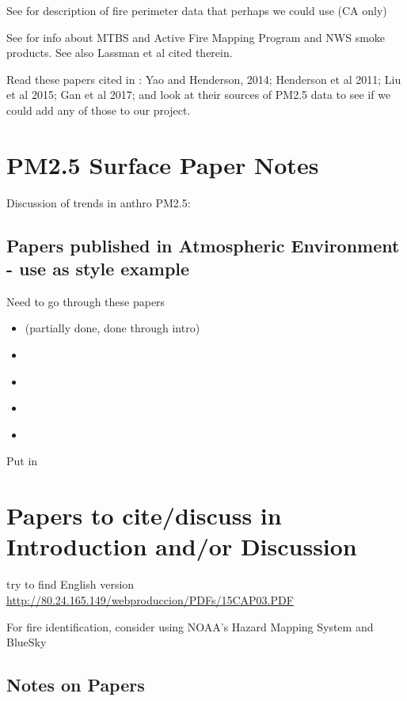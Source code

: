 See \cite{adelaine_assessment_2017} for description of fire perimeter data that perhaps we could use (CA only)

See \cite{vaidyanathan_developing_2018} for info about MTBS and Active Fire Mapping Program and NWS smoke products. See also Lassman et al \cite{lassman_spatial_2017} cited therein.

Read these papers cited in \cite{lassman_spatial_2017}: Yao and Henderson, 2014; Henderson et al 2011; Liu et al 2015; Gan et al 2017; and look at their sources of PM2.5 data to see if we could add any of those to our project.

\section{PM2.5 Surface Paper Notes}

Discussion of trends in anthro PM2.5: \cite{ridley_causes_2018}

\subsection{Papers published in Atmospheric Environment - use as style example}

Need to go through these papers
\begin{itemize}
\item \cite{BrokampExposure2017} (partially done, done through intro)
\item \cite{Sampson2013}
\item \cite{Anyenda2016}
\item \cite{Torvela2014}
\item \cite{Whiteman2014}
\end{itemize}

Put in \cite{BrokampExposure2017,larsen_impacts_2017}

\section{Papers to cite/discuss in Introduction and/or Discussion}

\cite{westerling_increasing_2016,WesterlingCorrection2016}

try to find English version \url{http://80.24.165.149/webproduccion/PDFs/15CAP03.PDF}

For fire identification, consider using NOAA's Hazard Mapping System and BlueSky

\subsection{Notes on Papers}

